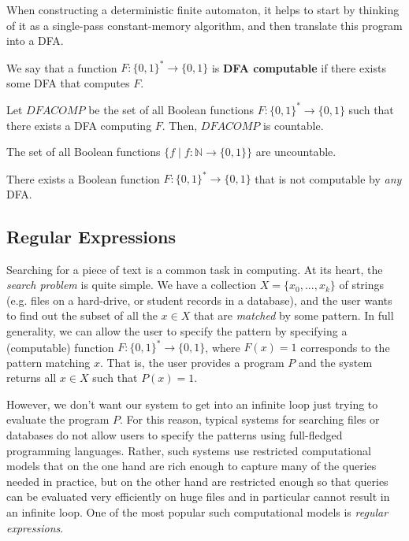 \documentclass{article}
\begin{document}
  When constructing a deterministic finite automaton, it helps to start by thinking of it as a single-pass constant-memory algorithm, and then translate this program into a DFA. 

  \begin{definition}
  We say that a function $F: \{0,1\}^* \longrightarrow \{0,1\}$ is \textbf{DFA computable} if there exists some DFA that computes $F$. 
  \end{definition}

  \begin{theorem}
  Let $DFACOMP$ be the set of all Boolean functions $F: \{0,1\}^* \longrightarrow \{0,1\}$ such that there exists a DFA computing $F$. Then, $DFACOMP$ is countable. 
  \end{theorem}

  \begin{lemma}
  The set of all Boolean functions $\{f\;|\; f: \mathbb{N} \longrightarrow \{0,1\}\}$ are uncountable. 
  \end{lemma}

  \begin{corollary}
  There exists a Boolean function $F: \{0,1\}^* \longrightarrow \{0,1\}$ that is not computable by \textit{any} DFA. 
  \end{corollary}

  \subsection{Regular Expressions}
  Searching for a piece of text is a common task in computing. At its heart, the \textit{search problem} is quite simple. We have a collection $X = \{x_0, ..., x_k\}$ of strings (e.g. files on a hard-drive, or student records in a database), and the user wants to find out the subset of all the $x \in X$ that are \textit{matched} by some pattern. In full generality, we can allow the user to specify the pattern by specifying a (computable) function $F: \{0,1\}^* \longrightarrow \{0,1\}$, where $F(x) = 1$ corresponds to the pattern matching $x$. That is, the user provides a program $P$ and the system returns all $x \in X$ such that $P(x) = 1$. 

  However, we don’t want our system to get into an infinite loop just trying to evaluate the program $P$. For this reason, typical systems for searching files or databases do not allow users to specify the patterns using full-fledged programming languages. Rather, such systems use restricted computational models that on the one hand are rich enough to capture many of the queries needed in practice, but on the other hand are restricted enough so that queries can be evaluated very efficiently on huge files and in particular cannot result in an infinite loop. One of the most popular such computational models is \textit{regular expressions}. 
\end{document}
